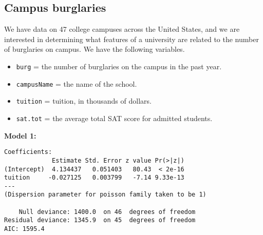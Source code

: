 \documentclass[11pt]{article}
\begin{document}
\newpage

\subsection{Campus burglaries}

We have data on 47 college campuses across the United States, and we are interested in determining what features of a university are related to the number of burglaries on campus. We have the following variables. 

\begin{itemize}
\item \texttt{burg} = the number of burglaries on the campus in the past year. 
\item \texttt{campusName} = the name of the school. 
\item \texttt{tuition} = tuition, in thousands of dollars. 
\item \texttt{sat.tot} = the average total SAT score for admitted students. 
\end{itemize}  

\textbf{Model 1:} 
{
\begin{verbatim}
Coefficients:
             Estimate Std. Error z value Pr(>|z|)    
(Intercept)  4.134437   0.051403   80.43  < 2e-16 
tuition     -0.027125   0.003799   -7.14 9.33e-13 
---
(Dispersion parameter for poisson family taken to be 1)

    Null deviance: 1400.0  on 46  degrees of freedom
Residual deviance: 1345.9  on 45  degrees of freedom
AIC: 1595.4
\end{verbatim}
}
\end{document}
